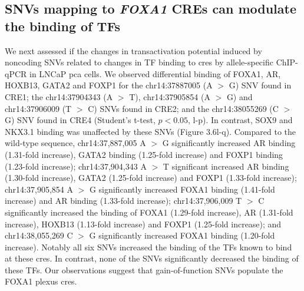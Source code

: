 \subsection{SNVs mapping to \emph{FOXA1} CREs can modulate the binding of TFs}

We next assessed if the changes in transactivation potential induced by noncoding SNVs related to changes in TF binding to \glspl{cre} by allele-specific ChIP-qPCR \cite{baileyNoncodingSomaticInherited2016,zhangIntegrativeFunctionalGenomics2012,cowper-sal*lariBreastCancerRisk2012} in LNCaP \gls{pca} cells.
We observed differential binding of FOXA1, AR, HOXB13, GATA2 and FOXP1 for the chr14:37887005 (A $>$ G) SNV found in CRE1; the chr14:37904343 (A $>$ T), chr14:37905854 (A $>$ G) and chr14:37906009 (T $>$ C) SNVs found in CRE2; and the chr14:38055269 (C $>$ G) SNV found in CRE4 (Student's t-test, $p<0.05$, l-p).
In contrast, SOX9 and NKX3.1 binding was unaffected by these SNVs (Figure  3.6l-q).
Compared to the wild-type sequence, chr14:37,887,005 A $>$ G significantly increased AR binding (1.31-fold increase), GATA2 binding (1.25-fold increase) and FOXP1 binding (1.23-fold increase); chr14:37,904,343 A $>$ T significant increased AR binding (1.30-fold increase), GATA2 (1.25-fold increase) and FOXP1 (1.33-fold increase); chr14:37,905,854 A $>$ G significantly increased FOXA1 binding (1.41-fold increase) and AR binding (1.33-fold increase); chr14:37,906,009 T $>$ C significantly increased the binding of FOXA1 (1.29-fold increase), AR (1.31-fold increase), HOXB13 (1.13-fold increase) and FOXP1 (1.25-fold increase); and chr14:38,055,269 C $>$ G significantly increased FOXA1 binding (1.20-fold increase).
Notably all six SNVs increased the binding of the TFs known to bind at these \glspl{cre}.
In contrast, none of the SNVs significantly decreased the binding of these TFs.
Our observations suggest that gain-of-function SNVs populate the FOXA1 plexus \glspl{cre}.
